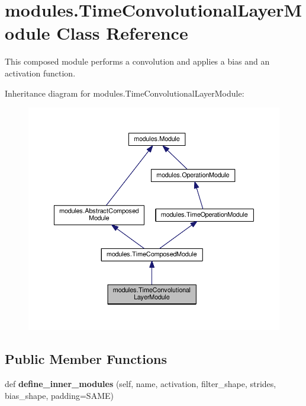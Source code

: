 \hypertarget{classmodules_1_1_time_convolutional_layer_module}{}\section{modules.\+Time\+Convolutional\+Layer\+Module Class Reference}
\label{classmodules_1_1_time_convolutional_layer_module}


This composed module performs a convolution and applies a bias and an activation function.  




Inheritance diagram for modules.\+Time\+Convolutional\+Layer\+Module\+:\nopagebreak
\begin{figure}[H]
\begin{center}
\leavevmode
\includegraphics[width=350pt]{classmodules_1_1_time_convolutional_layer_module__inherit__graph}
\end{center}
\end{figure}
\subsection*{Public Member Functions}
\begin{DoxyCompactItemize}
\item 
\mbox{\label{classmodules_1_1_time_convolutional_layer_module_abd09adc52e8ba14364ade4f8196e4fcb}} 
def {\bfseries define\+\_\+inner\+\_\+modules} (self, name, activation, filter\+\_\+shape, strides, bias\+\_\+shape, padding=\textquotesingle{}S\+A\+ME\textquotesingle{})
\end{DoxyCompactItemize}
